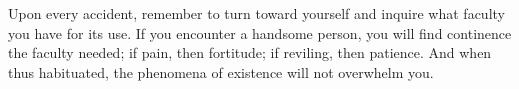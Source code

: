 Upon every accident, remember to turn  toward yourself and inquire what faculty
you  have for  its use.  If  you encounter  a  handsome person,  you will  find
continence  the faculty  needed; if  pain,  then fortitude;  if reviling,  then
patience.  And  when thus  habituated,  the  phenomena  of existence  will  not
overwhelm you.
